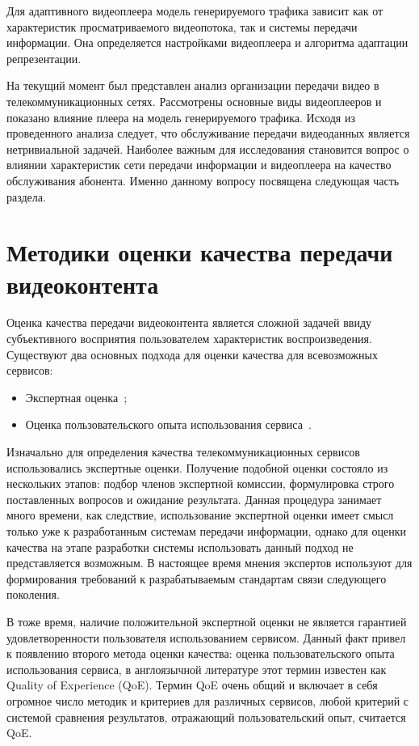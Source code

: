 Для адаптивного видеоплеера модель генерируемого трафика зависит как от характеристик просматриваемого видеопотока, так и системы передачи информации. Она определяется настройками видеоплеера и алгоритма адаптации репрезентации.

На текущий момент был представлен анализ организации передачи видео в телекоммуникационных сетях. Рассмотрены основные виды видеоплееров и показано влияние плеера на модель генерируемого трафика. Исходя из проведенного анализа следует, что обслуживание передачи видеоданных является нетривиальной задачей. Наиболее важным для исследования становится вопрос о влиянии характеристик сети передачи информации и видеоплеера на качество обслуживания абонента. Именно данному вопросу посвящена следующая часть раздела.

\section{Методики оценки качества передачи видеоконтента}
\label{chap1:VideoMOS}

Оценка качества передачи видеоконтента является сложной задачей ввиду субъективного восприятия пользователем характеристик воспроизведения. Существуют два основных подхода для оценки качества для всевозможных сервисов:
\begin{itemize}
  \item Экспертная оценка~\cite{Experts};
  \item Оценка пользовательского опыта использования сервиса~\cite{QoE}.
\end{itemize}

Изначально для определения качества телекоммуникационных сервисов использовались экспертные оценки. Получение подобной оценки состояло из нескольких этапов: подбор членов экспертной комиссии, формулировка строго поставленных вопросов и ожидание результата. Данная процедура занимает много времени, как следствие, использование экспертной оценки имеет смысл только уже к разработанным системам передачи информации, однако для оценки качества на этапе разработки системы использовать данный подход не представляется возможным. В настоящее время мнения экспертов используют для формирования требований к разрабатываемым стандартам связи следующего поколения.

В тоже время, наличие положительной экспертной оценки не является гарантией удовлетворенности пользователя использованием сервисом. Данный факт привел к появлению второго метода оценки качества: оценка пользовательского опыта использования сервиса, в англоязычной литературе этот термин известен как Quality of Experience (QoE). Термин QoE очень общий и включает в себя огромное число методик и критериев для различных сервисов, любой критерий с системой сравнения результатов, отражающий пользовательский опыт, считается QoE.

